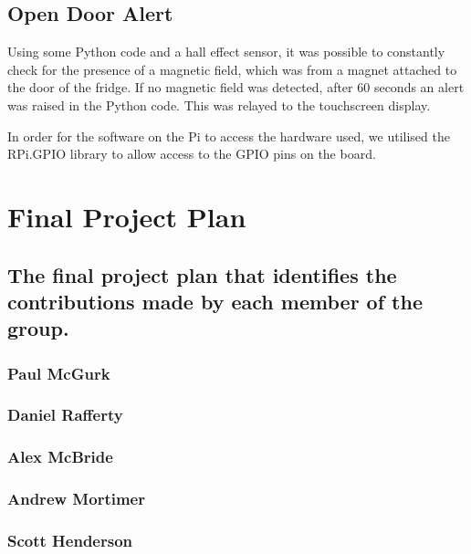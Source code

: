 \documentclass[10pt]{article}
\begin{document}
\subsection{Open Door Alert}
Using some Python code and a hall effect sensor,  it was possible to constantly check for the presence of a magnetic field, which was from a magnet attached to the door of the fridge. If no magnetic field was detected, after 60 seconds an alert was raised in the Python code. This was relayed to the touchscreen display.

In order for the software on the Pi to access the hardware used, we utilised the RPi.GPIO library to allow access to the GPIO pins on the board.

\section{Final Project Plan}
\subsection{The final project plan that identifies the contributions made by each member of the group.}
\subsubsection{Paul McGurk}
\subsubsection{Daniel Rafferty}
\subsubsection{Alex McBride}
\subsubsection{Andrew Mortimer}
\subsubsection{Scott Henderson}
\end{document}
